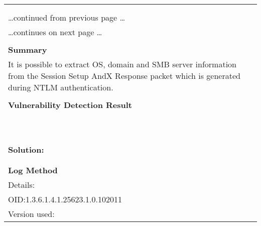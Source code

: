\documentclass{article}
\begin{document}
\begin{longtable}{|p{}|}
\hline
\rowcolor{gvm_log}{\color{white}{Log (CVSS: 0.0) }}\\
\rowcolor{gvm_log}{\color{white}{NVT: SMB NativeLanMan}}\\
\hline
\endfirsthead
\hfill\ldots continued from previous page \ldots \\
\hline
\endhead
\hline
\ldots continues on next page \ldots \\
\endfoot
\hline
\endlastfoot
\\
\textbf{Summary}\\
It is possible to extract OS, domain and SMB server information
  from the Session Setup AndX Response packet which is generated during NTLM authentication.\\

        \hline
        \\
\textbf{Vulnerability Detection Result}\\
\rowcolor{white}{\verb=Detected Samba=}\\
\rowcolor{white}{\verb=Version:       4.6.2=}\\
\rowcolor{white}{\verb=Location:      445/tcp=}\\
\rowcolor{white}{\verb=CPE:           cpe:/a:samba:samba:4.6.2=}\\
\rowcolor{white}{\verb=Concluded from version/product identification result:=}\\
\rowcolor{white}{\verb=Samba 4.6.2=}\\
\rowcolor{white}{\verb=Extra information:=}\\
\rowcolor{white}{\verb=Detected SMB workgroup: DREAMBOX=}\\
\rowcolor{white}{\verb=Detected SMB server: Samba 4.6.2=}\\

          \hline
          \\
\textbf{Solution:}\\
\\


        \hline
        \\
\textbf{Log Method}\\
Details:
\rowcolor{white}{\verb=SMB NativeLanMan=}\\
OID:1.3.6.1.4.1.25623.1.0.102011\\
Version used:
\rowcolor{white}{\verb=2021-09-06T06:22:50Z=}\\
\end{longtable}
\end{document}
